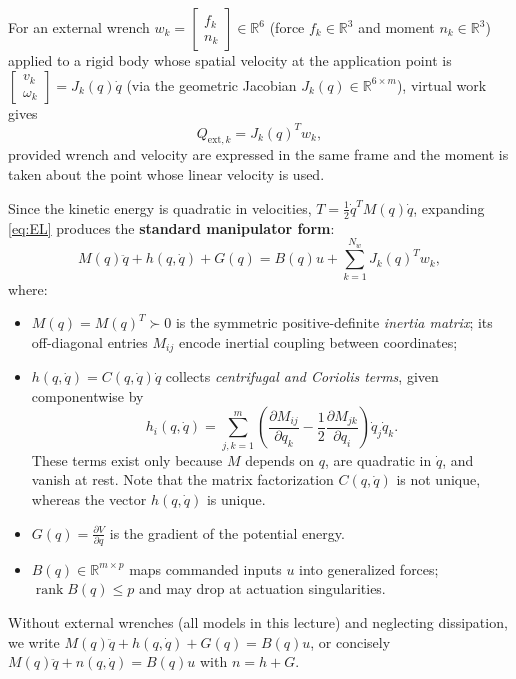 \documentclass[11pt, a4paper]{article}
\theoremstyle{definition}
\theoremstyle{plain}
\begin{document}
For an external wrench $w_k = \begin{bmatrix} f_k \\ n_k \end{bmatrix} \in \mathbb{R}^6$ (force $f_k \in \mathbb{R}^3$ and moment $n_k \in \mathbb{R}^3$) applied to a rigid body whose spatial velocity at the application point is $\begin{bmatrix} v_k \\ \omega_k \end{bmatrix} = J_k(q)\dot{q}$ (via the geometric Jacobian $J_k(q) \in \mathbb{R}^{6 \times m}$), virtual work gives
\[
  Q_{\text{ext}, k} = J_k(q)^T w_k,
\]
provided wrench and velocity are expressed in the same frame and the moment is taken about the point whose linear velocity is used.

Since the kinetic energy is quadratic in velocities, $T = \frac{1}{2}\dot{q}^T M(q)\dot{q}$, expanding \eqref{eq:EL} produces the \textbf{standard manipulator form}:
\begin{equation}
  M(q)\ddot{q} + h(q, \dot{q}) + G(q) = B(q)u + \sum_{k=1}^{N_w} J_k(q)^T w_k,
  \label{eq:standard_form}
\end{equation}
where:
\begin{itemize}
  \item $M(q) = M(q)^T \succ 0$ is the symmetric positive-definite \emph{inertia matrix}; its off-diagonal entries $M_{ij}$ encode inertial coupling between coordinates;
  \item $h(q, \dot{q}) = C(q,\dot{q})\dot{q}$ collects \emph{centrifugal and Coriolis terms}, given componentwise by
  \[
    h_i(q, \dot{q}) = \sum_{j,k=1}^{m} \left(\frac{\partial M_{ij}}{\partial q_k} - \frac{1}{2}\frac{\partial M_{jk}}{\partial q_i}\right)\dot{q}_j \dot{q}_k.
  \]
  These terms exist only because $M$ depends on $q$, are quadratic in $\dot{q}$, and vanish at rest. Note that the matrix factorization $C(q,\dot{q})$ is not unique, whereas the vector $h(q,\dot{q})$ is unique.
  \item $G(q) = \frac{\partial V}{\partial q}$ is the gradient of the potential energy.
  \item $B(q) \in \mathbb{R}^{m \times p}$ maps commanded inputs $u$ into generalized forces; $\operatorname{rank} B(q) \le p$ and may drop at actuation singularities.
\end{itemize}
Without external wrenches (all models in this lecture) and neglecting dissipation, we write $M(q)\ddot{q} + h(q,\dot{q}) + G(q) = B(q)u$, or concisely $M(q)\ddot{q} + n(q,\dot{q}) = B(q)u$ with $n = h + G$.
\end{document}
